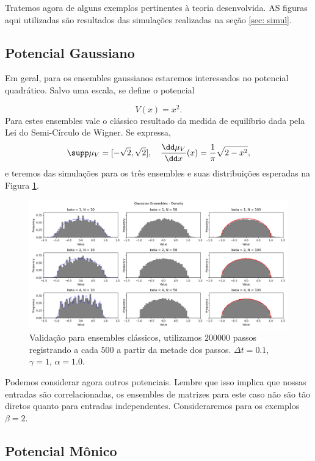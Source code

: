 Tratemos agora de alguns exemplos pertinentes à teoria desenvolvida. AS figuras aqui utilizadas são resultados das simulações realizadas na seção \ref{sec: simul}.

\subsection{Potencial Gaussiano}

Em geral, para os ensembles gaussianos estaremos interessados no potencial quadrático. Salvo uma escala, se define o potencial

\[
	V(x) = x^2.
\]
Para estes ensembles vale o clássico resultado da medida de equilíbrio dada pela Lei do Semi-Círculo de Wigner. Se expressa,
\[
\supp \mu_V = [-\sqrt{2}, \sqrt{2}], \quad \frac{\dd \mu_V}{\dd x}(x) = \frac{1}{\pi} \sqrt{2 - x^2},
\]
e teremos das simulações para os três ensembles e suas distribuições esperadas na Figura \ref{fig: semicircle}.

\begin{figure}[ht!]
	\centering
	\includegraphics[scale=0.45]{Assets/validationArticleAlg}
	\caption{Validação para ensembles clássicos, utilizamos $200000$ passos registrando a cada $500$ a partir da metade dos passos. $\Delta t = 0.1$, $\gamma = 1$, $\alpha = 1.0$.}
	\label{fig: semicircle}
\end{figure}

Podemos considerar agora outros potenciais. Lembre que isso implica que nossas entradas são correlacionadas, os ensembles de matrizes para este caso não são tão diretos quanto para entradas independentes. Consideraremos para os exemplos $\beta = 2$.

\subsection{Potencial Mônico}

